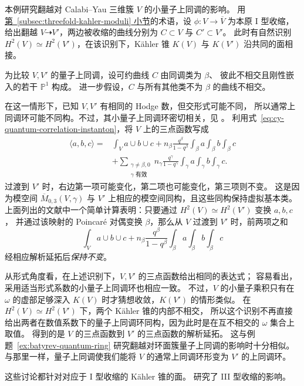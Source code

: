 \begin{example}\label{ex:flop-quantum-invariance}
本例研究翻越对 Calabi--Yau 三维簇 $V$ 的小量子上同调的影响。
用\hyperref[subsec:threefold-kahler-moduli]{第~\ref*{subsec:threefold-kahler-moduli} 小节}的术语，设 $\phi:V\to\overline V$ 为本原 I 型收缩，
给出翻越 $V\dashrightarrow V'$，两边被收缩的曲线分别为 $C\subset V$ 与 $C'\subset V'$。
此时有自然识别 $H^2(V)\simeq H^2(V')$，在该识别下，Kähler 锥 $K(V)$ 与 $K(V')$ 沿共同的面相接。

为比较 $V,V'$ 的量子上同调，设可约曲线 $C$ 由同调类为 $\beta$、
彼此不相交且刚性嵌入的若干 $\mathbb P^1$ 构成。
进一步假设，$C$ 与所有其他类不为 $\beta$ 的曲线不相交。

在这一情形下，已知 $V,V'$ 有相同的 Hodge 数，但交形式可能不同，
所以通常上同调环可能不同构。不过，其小量子上同调环密切相关，见 。
利用式~\eqref{eq:cy-quantum-correlation-instanton}，将 $V$ 上的三点函数写成
\[
\begin{aligned}
\langle a,b,c\rangle={}&\int_Va\cup b\cup c
+n_\beta\frac{q^\beta}{1-q^\beta}\int_\beta a\int_\beta b\int_\beta c\\
&+\sum_{\substack{\gamma\ne\beta,0\\\gamma\text{ 有效}}}n_\gamma\frac{q^\gamma}{1-q^\gamma}
\int_\gamma a\int_\gamma b\int_\gamma c.
\end{aligned}
\]
过渡到 $V'$ 时，右边第一项可能变化，第二项也可能变化，第三项则不变。
这是因为模空间 $\overline M_{0,3}(V,\gamma)$ 与 $V'$ 上相应的模空间同构，且这些同构保持虚拟基本类。
上面列出的文献中一个简单计算表明：只要通过 $H^2(V)\simeq H^2(V')$ 变换 $a,b,c$，
并通过该映射的 Poincaré 对偶变换 $\beta$，那么从 $V$ 过渡到 $V'$ 时，前两项之和
\[
\int_Va\cup b\cup c+n_\beta\frac{q^\beta}{1-q^\beta}\int_\beta a\int_\beta b\int_\beta c
\]
经相应解析延拓后\emph{保持不变}。

从形式角度看，在上述识别下，$V,V'$ 的三点函数给出相同的表达式；
容易看出，采用适当形式系数的小量子上同调环也相应一致。
不过，$V$ 的小量子乘积只有在 $\omega$ 的虚部足够深入 $K(V)$ 时才猜想收敛，$K(V')$ 的情形类似。
在 $H^2(V)\simeq H^2(V')$ 下，两个 Kähler 锥的内部不相交，
所以这个识别不再直接给出两者在数值系数下的量子上同调环同构，因为此时是在互不相交的 $\omega$ 集合上取值。
得到的是 $V$ 的三点函数到 $V'$ 的三点函数的解析延拓。
这与例题~\ref{ex:batyrev-quantum-ring} 研究翻越对环面簇量子上同调的影响时十分相似。
与那里一样，量子上同调使我们能将 $V$ 的通常上同调环形变为 $V'$ 的上同调环。

这些讨论都针对对应于 I 型收缩的 Kähler 锥的面。
 研究了 III 型收缩的影响。
\end{example}

